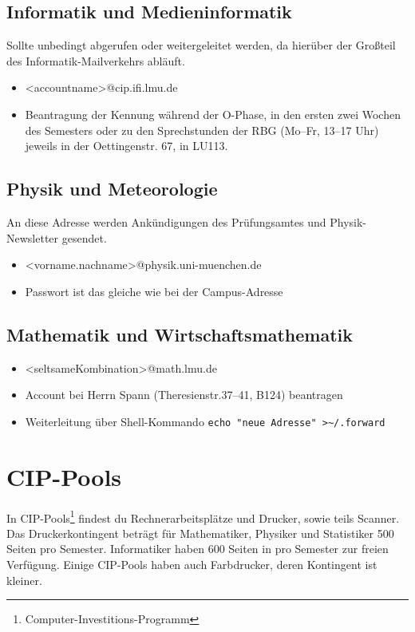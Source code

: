 \subsection*{Informatik und Medieninformatik}
Sollte unbedingt abgerufen oder weitergeleitet werden, da hierüber der Großteil des Informatik-Mailverkehrs abläuft. 
\begin{itemize}
	\item <accountname>@cip.ifi.lmu.de
	\item Beantragung der Kennung während der O-Phase, in den ersten zwei Wochen des Semesters oder zu den Sprechstunden der RBG 
		(Mo--Fr, 13--17 Uhr) jeweils in der Oettingenstr. 67, in LU113.
\end{itemize}
\begin{urlList} 	
\end{urlList}
	
\subsection*{Physik und Meteorologie}
An diese Adresse werden Ankündigungen des Prüfungsamtes und
Physik-Newsletter gesendet.

\begin{itemize}
	\item <vorname.nachname>@physik.uni-muenchen.de
	\item Passwort ist das gleiche wie bei der Campus-Adresse
\end{itemize}
		\begin{urlList}
		\end{urlList}
      
\subsection*{Mathematik und Wirtschaftsmathematik}
\begin{itemize}
	\item <seltsameKombination>@math.lmu.de
	\item Account bei Herrn Spann (Theresienstr.37--41, B124) beantragen
	\item Weiterleitung über Shell-Kommando \verb|echo "neue Adresse" >~/.forward|
\end{itemize}

\section{CIP-Pools}
In CIP-Pools\footnote{Computer-Investitions-Programm} findest du Rechnerarbeitsplätze und Drucker, sowie teils Scanner. Das Druckerkontingent beträgt für Mathematiker, Physiker und Statistiker 500 Seiten pro Semester. Informatiker haben 600 Seiten in pro Semester zur freien Verfügung. Einige CIP-Pools haben auch Farbdrucker, deren Kontingent ist kleiner.

